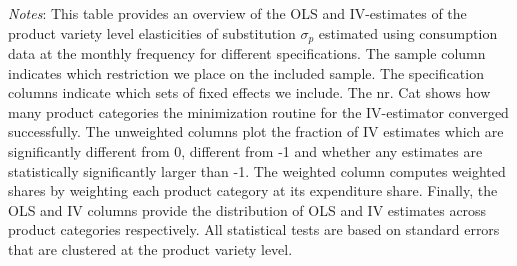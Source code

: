 \begin{landscape}
    \begin{table}[H]
        \centering
        \caption{Monthly Barcode-level Elasticities: Within store instrument}
        \label{tab: app_elas_sigma_cats_monthly}
        \begin{spacing}{1}
        \end{spacing}
        \parbox{1.2\textwidth}{
        \vspace{10pt}
        \begin{spacing}{1} 
            {\footnotesize 
            \textit{Notes}: This table provides an overview of the OLS and IV-estimates of the product variety level elasticities of substitution $\sigma_p$ estimated using consumption data at the monthly frequency for different specifications. The sample column indicates which restriction we place on the included sample. The specification columns indicate which sets of fixed effects we include. The nr. Cat shows how many product categories the minimization routine for the IV-estimator converged successfully. The unweighted columns plot the fraction of IV estimates which are significantly different from 0, different from -1 and whether any estimates are statistically significantly larger than -1. The weighted column computes weighted shares by weighting each product category at its expenditure share. Finally, the OLS and IV columns provide the distribution of OLS and IV estimates across product categories respectively. All statistical tests are based on standard errors that are clustered at the product variety level.}
            \end{spacing}}
    \end{table}
\end{landscape}

